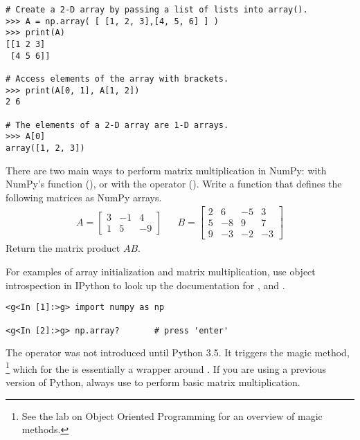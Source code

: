 \begin{lstlisting}
# Create a 2-D array by passing a list of lists into array().
>>> A = np.array( [ [1, 2, 3],[4, 5, 6] ] )
>>> print(A)
[[1 2 3]
 [4 5 6]]

# Access elements of the array with brackets.
>>> print(A[0, 1], A[1, 2])
2 6

# The elements of a 2-D array are 1-D arrays.
>>> A[0]
array([1, 2, 3])
\end{lstlisting}

\begin{problem} %
There are two main ways to perform matrix multiplication in NumPy: with NumPy's  function (), or with the  operator ().
Write a function that defines the following matrices as NumPy arrays.
\begin{align*}
A = \left[\begin{array}{rrr}
3 & -1 &  4 \\
1 &  5 & -9 \end{array}\right]
&&
B = \left[\begin{array}{cccc}
2 &  6 & -5 &  3\\
5 & -8 &  9 &  7\\
9 & -3 & -2 & -3\end{array}\right]
\end{align*}
Return the matrix product $AB$.

For examples of array initialization and matrix multiplication, use object introspection in IPython to look up the documentation for ,  and .
\begin{lstlisting}
<g<In [1]:>g> import numpy as np

<g<In [2]:>g> np.array?       # press 'enter'
\end{lstlisting}
\end{problem}

\begin{warn} %
The  operator was not introduced until Python 3.5.
It triggers the  magic method,%
\footnote{See the lab on Object Oriented Programming for an overview of magic methods.}
which for the  is essentially a wrapper around .
If you are using a previous version of Python, always use  to perform basic matrix multiplication.
\end{warn}

